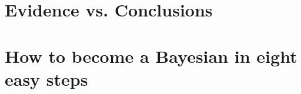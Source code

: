 \section{Evidence vs. Conclusions}
\label{sec:Evidencevs.Conclusions}



\section{How to become a Bayesian in eight easy steps}
\label{sec:HowtobecomeaBayesianineighteasysteps}

